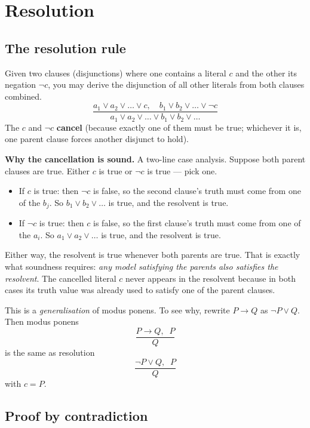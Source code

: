 \documentclass[11pt, a4paper]{article}
\begin{document}
\section{Resolution}

\subsection{The resolution rule}

\begin{defbox}
Given two clauses (disjunctions) where one contains a literal $c$ and the other its negation $\neg c$, you may derive the disjunction of all other literals from both clauses combined.
\[
\frac{a_1 \lor a_2 \lor \dots \lor c, \quad b_1 \lor b_2 \lor \dots \lor \neg c}{a_1 \lor a_2 \lor \dots \lor b_1 \lor b_2 \lor \dots}
\]
The $c$ and $\neg c$ \textbf{cancel} (because exactly one of them must be true; whichever it is, one parent clause forces another disjunct to hold).
\end{defbox}

\textbf{Why the cancellation is sound.} A two-line case analysis. Suppose both parent clauses are true. Either $c$ is true or $\neg c$ is true — pick one.
\begin{itemize}[leftmargin=*, itemsep=0pt, topsep=0pt]
  \item If $c$ is true: then $\neg c$ is false, so the second clause's truth must come from one of the $b_j$. So $b_1 \lor b_2 \lor \dots$ is true, and the resolvent is true.
  \item If $\neg c$ is true: then $c$ is false, so the first clause's truth must come from one of the $a_i$. So $a_1 \lor a_2 \lor \dots$ is true, and the resolvent is true.
\end{itemize}
Either way, the resolvent is true whenever both parents are true. That is exactly what soundness requires: \emph{any model satisfying the parents also satisfies the resolvent}. The cancelled literal $c$ never appears in the resolvent because in both cases its truth value was already used to satisfy one of the parent clauses.

This is a \emph{generalisation} of modus ponens. To see why, rewrite $P \rightarrow Q$ as $\neg P \lor Q$. Then modus ponens
\[
\frac{P \rightarrow Q, \;\; P}{Q}
\]
is the same as resolution
\[
\frac{\neg P \lor Q, \;\; P}{Q}
\]
with $c = P$.

\subsection{Proof by contradiction}
\end{document}
